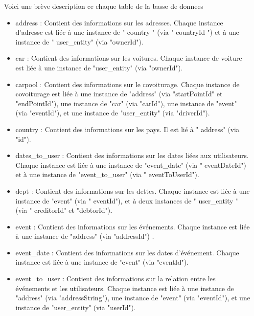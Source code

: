 Voici une brève description ce chaque table de la basse de donnees
\begin{itemize}
    \item address : Contient des informations sur les adresses.
    Chaque instance d'adresse est liée à une instance de " country " (via " countryId ") et à une instance de " user\_entity" (via "ownerId").\\
    \item car : Contient des informations sur les voitures.
    Chaque instance de voiture est liée à une instance de "user\_entity" (via "ownerId").\\
    \item carpool : Contient des informations sur le covoiturage.
    Chaque instance de covoiturage est liée à une instance de "address" (via "startPointId" et "endPointId"), une instance de "car" (via "carId"),
    une instance de "event" (via "eventId"), et une instance de "user\_entity" (via "driverId").\\
    \item country : Contient des informations sur les pays.
    Il est lié à " address" (via "id").\\
    \item  dates\_to\_user : Contient des informations sur les dates liées aux utilisateurs.
    Chaque instance est liée à une instance de "event\_date" (via " eventDateId") et à une instance de "event\_to\_user" (via " eventToUserId").\\
    \item dept : Contient des informations sur les dettes.
    Chaque instance est liée à une instance de "event" (via " eventId"), et à deux instances de " user\_entity " (via " creditorId" et "debtorId").\\
    \item event : Contient des informations sur les événements.
    Chaque instance est liée à une instance de "address" (via "addressId") .\\
    \item event\_date : Contient des informations sur les dates d'événement.
    Chaque instance est liée à une instance de "event" (via "eventId").\\
    \item event\_to\_user : Contient des informations sur la relation entre les événements et les utilisateurs.
    Chaque instance est liée à une instance de "address" (via "addressString"), une instance de "event" (via "eventId"), et une instance de "user\_entity" (via "userId").\\

\end{itemize}
